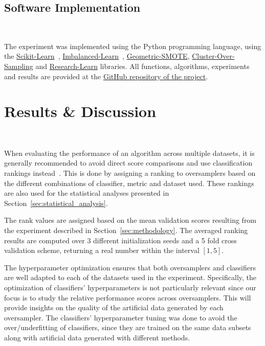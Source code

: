 \documentclass[information,article,submit,moreauthors,pdftex]{Definitions/mdpi}
\begin{document}
\begin{paracol}{2}
\linenumbers
\switchcolumn

\subsection{Software Implementation}~\label{sec:implementation}

The experiment was implemented using the Python programming language, using the
\href{https://scikit-learn.org/stable/}{Scikit-Learn}~\citep{Pedregosa2011},
\href{https://imbalanced-learn.org/en/stable/}{Imbalanced-Learn}~\citep{JMLR:v18:16-365},
\href{https://geometric-smote.readthedocs.io/en/latest/?badge=latest}{Geometric-SMOTE},
\href{https://cluster-over-sampling.readthedocs.io/en/latest/?badge=latest}{Cluster-Over-Sampling}
and \href{https://research-learn.readthedocs.io/en/latest/?badge=latest}{Research-Learn} libraries.
All functions, algorithms, experiments and results are provided at the
\href{https://github.com/AlgoWit/publications}{GitHub
repository of the project}.

\section{Results \& Discussion}~\label{sec:results}

When evaluating the performance of an algorithm across multiple datasets, it
is generally recommended to avoid direct score comparisons and use
classification rankings instead~\citep{demvsar2006}. This is done by assigning
a ranking to oversamplers based on the different combinations of classifier,
metric and dataset used. These rankings are also used for the statistical
analyses presented in Section~\ref{sec:statistical_analysis}.

The rank values are assigned based on the mean validation scores resulting
from the experiment described in Section~\ref{sec:methodology}. The averaged
ranking results are computed over 3 different initialization seeds and a 5
fold cross validation scheme, returning a real number within the interval
$[1,5]$.

The hyperparameter optimization ensures that both oversamplers and classifiers
are well adapted to each of the datasets used in the experiment. Specifically,
the optimization of classifiers' hyperparameters is not particularly relevant
since our focus is to study the relative performance scores across
oversamplers. This will provide insights on the quality of the artificial data
generated by each oversampler. The classifiers' hyperparameter tuning was done
to avoid the over/underfitting of classifiers, since they are trained on the same
data subsets along with artificial data generated with different methods.


\end{paracol}
\end{document}
